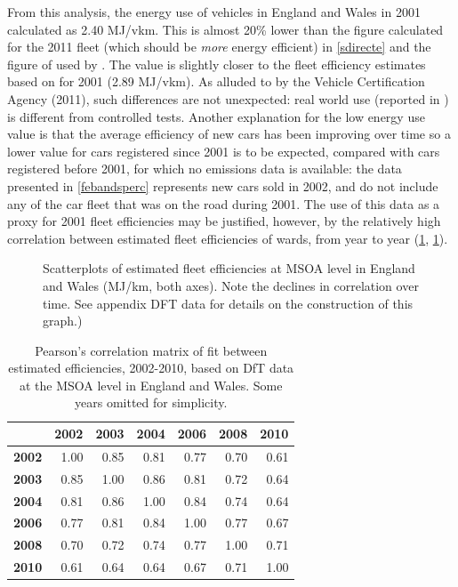 From this analysis, the energy use of vehicles in England and
Wales in 2001 calculated as 2.40 MJ/vkm. This is almost 20\% lower than the figure
calculated for the 2011 fleet (which should be \emph{more} energy efficient)
in \cref{sdirecte} and the figure of used by \citet{MacKay2009}.
The value is slightly closer to the fleet efficiency estimates based on
\citet{Decc2011t} for 2001 (2.89 MJ/vkm).
As alluded to by the Vehicle
Certification Agency (2011), such differences are not unexpected: real world use
(reported in \citet{Decc2011t})
is different from controlled tests. Another explanation for the low energy use
value is that the average efficiency of new cars has been improving over time
so a lower value for cars registered since 2001 is to be expected, compared
with cars registered before 2001, for which no emissions data is available:
the data presented in \cref{febandsperc} represents new cars sold in 2002, and do not
include any of the car fleet that was on the road during 2001. The use of this
data as a proxy for 2001 fleet efficiencies may be justified, however, by the
relatively high correlation between estimated fleet efficiencies of wards, from
year to year (\cref{ffleetscat}, \cref{tfleetscat}).

\begin{figure}
 \caption[Scatterplots of estimated fleet efficiencies at MSOA level]
 {Scatterplots of estimated fleet efficiencies at MSOA level in England
and Wales (MJ/km, both axes). Note the declines in correlation over time.
See appendix DFT data for details on the construction of this graph.)
} \label{ffleetscat}
\end{figure}

\begin{table}[htbp]
\caption[Correlation matrix of estimated fleet efficiencies, 2002-2010]
{Pearson's correlation matrix of fit between estimated efficiencies,
2002-2010, based on DfT data at the MSOA level in England and Wales. Some years
omitted for simplicity.}
\begin{center}
\begin{tabular}{rrrrrrr}
\toprule
& \textbf{2002} & \textbf{2003} & \textbf{2004} &
\textbf{2006} & \textbf{2008} & \textbf{2010} \\
\midrule
\textbf{2002} & 1.00 & 0.85 & 0.81 & 0.77 & 0.70 & 0.61 \\
\textbf{2003} & 0.85 & 1.00 & 0.86 & 0.81 & 0.72 & 0.64 \\
\textbf{2004} & 0.81 & 0.86 & 1.00 & 0.84 & 0.74 & 0.64 \\
\textbf{2006} & 0.77 & 0.81 & 0.84 & 1.00 & 0.77 & 0.67 \\
\textbf{2008} & 0.70 & 0.72 & 0.74 & 0.77 & 1.00 & 0.71 \\
\textbf{2010} & 0.61 & 0.64 & 0.64 & 0.67 & 0.71 & 1.00 \\ \bottomrule
\end{tabular}  \end{center}
\label{tfleetscat}
\end{table}


